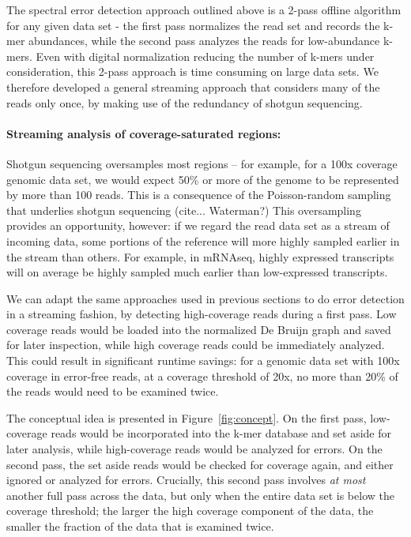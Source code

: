 \documentclass{article}
\begin{document}
The spectral error detection approach outlined above is a 2-pass
offline algorithm for any given data set - the first pass normalizes
the read set and records the k-mer abundances, while the second pass
analyzes the reads for low-abundance k-mers.  Even with digital
normalization reducing the number of k-mers under consideration, this
2-pass approach is time consuming on large data sets.  We therefore
developed a general streaming approach that considers many of the
reads only once, by making use of the redundancy of shotgun
sequencing.

\paragraph{Streaming analysis of coverage-saturated regions:}

Shotgun sequencing oversamples most regions --
for example, for a 100x coverage genomic data set, we would expect
50\% or more of the genome to be represented by more than 100 reads.
This is a consequence of the Poisson-random sampling that underlies
shotgun sequencing (cite... Waterman?)  This oversampling provides an
opportunity, however: if we regard the read data set as a stream of
incoming data, some portions of the reference will more highly sampled
earlier in the stream than others.  For example, in mRNAseq, highly
expressed transcripts will on average be highly sampled much earlier
than low-expressed transcripts.

We can adapt the same approaches used in previous sections to do error
detection in a streaming fashion, by detecting high-coverage reads
during a first pass.  Low coverage reads would be loaded into the
normalized De Bruijn graph and saved for later inspection, while high
coverage reads could be immediately analyzed.  This could result in
significant runtime savings: for a genomic data set with 100x coverage
in error-free reads, at a coverage threshold of 20x, no more than 20\%
of the reads would need to be examined twice.

The conceptual idea is presented in Figure~\ref{fig:concept}.  On the
first pass, low-coverage reads would be incorporated into the k-mer
database and set aside for later analysis, while high-coverage reads
would be analyzed for errors. On the second pass, the set aside reads
would be checked for coverage again, and either ignored or analyzed
for errors.  Crucially, this second pass involves {\em at most}
another full pass across the data, but only when the entire data set
is below the coverage threshold; the larger the high coverage
component of the data, the smaller the fraction of the data that is
examined twice.
\end{document}
